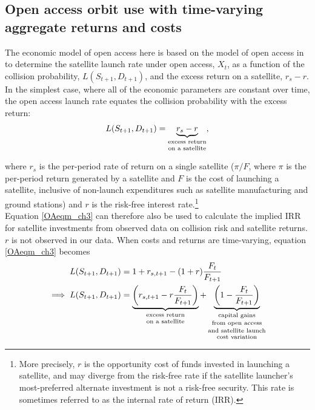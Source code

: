 \documentclass[12pt]{article}
\begin{document}
\subsection{Open access orbit use with time-varying aggregate returns and costs}

The economic model of open access here is based on the model of open access in \citet{raorondinaWP} to determine the satellite launch rate under open access, $X_t$, as a function of the collision probability, $L(S_{t+1},D_{t+1})$, and the excess return on a satellite, $r_{s} - r$. In the simplest case, where all of the economic parameters are constant over time, the open access launch rate equates the collision probability with the excess return:
\begin{equation}
\label{OAeqm_ch3}
L(S_{t+1},D_{t+1}) = \underbrace{r_s - r}_{\text{\shortstack{excess return\\on a satellite}}},
\end{equation}

where $r_s$ is the per-period rate of return on a single satellite ($\pi/F$, where $\pi$ is the per-period return generated by a satellite and $F$ is the cost of launching a satellite, inclusive of non-launch expenditures such as satellite manufacturing and ground stations) and $r$ is the risk-free interest rate.\footnote{More precisely, $r$ is the opportunity cost of funds invested in launching a satellite, and may diverge from the risk-free rate if the satellite launcher's most-preferred alternate investment is not a risk-free security. This rate is sometimes referred to as the internal rate of return (IRR).} \\

Equation \ref{OAeqm_ch3} can therefore also be used to calculate the implied IRR for satellite investments from observed data on collision risk and satellite returns. $r$ is not observed in our data. When costs and returns are time-varying, equation \ref{OAeqm_ch3} becomes
\begin{align}
\label{OAeqm_ch3_2}
L(S_{t+1},D_{t+1}) &= 1+ r_{s,t+1} - (1+r) \frac{F_t}{F_{t+1}} \\
\implies L(S_{t+1},D_{t+1}) &= \underbrace{\left( r_{s,t+1} - r \frac{F_t}{F_{t+1}} \right)}_{\text{\shortstack{excess return\\on a satellite}}} + \underbrace{\left(1 - \frac{F_t}{F_{t+1}} \right)}_{\text{\shortstack{capital gains\\from open access\\and satellite launch\\cost variation}}} \nonumber
\end{align}
\end{document}
